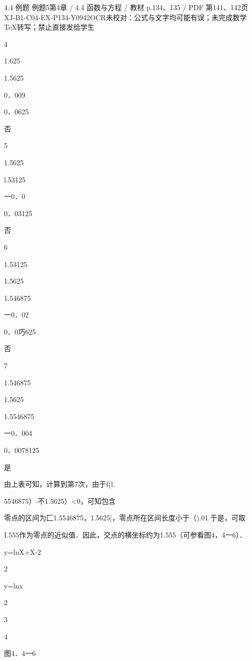 \begin{bankitem}{4.4 例题 例题5}{第4章 / 4.4 函数与方程 / 教材 p.134、135 / PDF 第141、142页}{XJ-B1-C04-EX-P134-Y0942}{OCR未校对：公式与文字均可能有误；未完成数学TeX转写；禁止直接发给学生}
\begin{ocrdraft}
4
\par
1.625
\par
1.5625
\par
0．009
\par
0．0625
\par
否
\par
5
\par
1.5625
\par
l.53125
\par
一0．0
\par
0．03125
\par
否
\par
6
\par
1.53125
\par
1.5625
\par
1.546875
\par
一0．02
\par
0．0巧625
\par
否
\par
7
\par
1.546875
\par
1.5625
\par
1.5546875
\par
一0．004
\par
0．0078125
\par
是
\par
由上表可知，计算到第7次，由于f(l.
\par
5546875）\ensuremath{\cdot}不1.5625）<0，可知包含
\par
[教材p.135 / PDF第142页]
\par
零点的区间为匚1.5546875，1.5625]，零点所在区间长度小于（).01.于是，可取
\par
I.555作为零点的近似值．因此，交点的横坐标约为1.555（可参看图4，4一6）．
\par
y=lnX+X-2
\par
2
\par
y=lnx
\par
2
\par
3
\par
4
\par
图4．4一6
\end{ocrdraft}
\end{bankitem}
